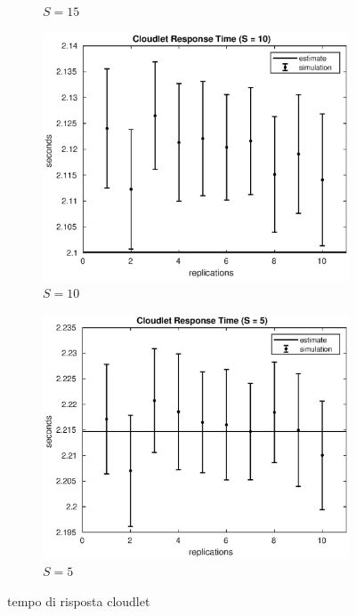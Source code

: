 \begin{figure}[!h]
\begin{subfigure}[t]{0.49\textwidth}
\caption{$S = 15$}
\label{15_sclet}
\end{subfigure}
%
\begin{subfigure}[t]{0.49\textwidth}
\includegraphics[width=\textwidth]{figures/simul/10_500K_sclet}
\caption{$S = 10$}
\label{10_sclet}
\end{subfigure}
%
\begin{subfigure}[t]{0.49\textwidth}
\includegraphics[width=\textwidth]{figures/simul/5_500K_sclet}
\caption{$S = 5$}
\label{5_sclet}
\end{subfigure}
%
\caption{tempo di risposta cloudlet}
\label{plot:sclet}
\end{figure}
%
%

